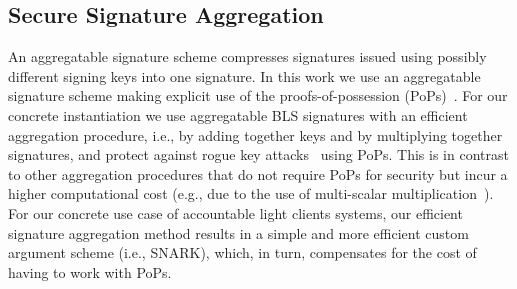 \subsection{Secure Signature Aggregation}
\label{sec:multisig}
\vspace{-0.03in}
An aggregatable signature scheme compresses signatures issued using possibly 
different signing keys into one signature. In this work we use an aggregatable 
signature scheme making explicit use of the proofs-of-possession (PoPs)~\cite{proofs_of_posession}.
For our concrete instantiation we use aggregatable BLS signatures with an 
efficient aggregation procedure, i.e., by adding together keys and by multiplying together 
signatures, and protect against rogue key attacks~\cite{proofs_of_posession} using PoPs. 
This is in contrast to other aggregation procedures that do not require PoPs for security 
but incur a higher computational cost (e.g., due to the use of multi-scalar multiplication~\cite{boneh_compact_multisig}). 
For our concrete use case of accountable light clients systems, our efficient signature aggregation method results 
in a simple and more efficient custom argument scheme (i.e., SNARK), which, in turn, compensates for the cost of having 
to work with PoPs. 
\vspace{-0.05in}

